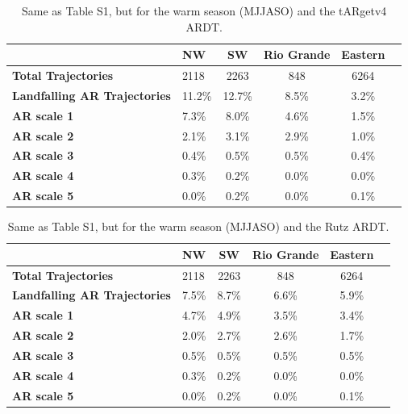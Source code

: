 \documentclass[draft,jgrga]{agutexSI2019}
\begin{document}
\begin{article}
\begin{table}
\caption{Same as Table S1, but for the warm season (MJJASO) and the tARgetv4 ARDT.}
\label{table:MJJASOtARget}
\begin{tabular}{lp{2cm}cccc}
\toprule
 & NW & SW & Rio Grande & Eastern \\
\midrule
\textbf{Total Trajectories} & 2118 & 2263 & 848 & 6264 \\
\textbf{Landfalling AR Trajectories} & 11.2\% & 12.7\% & 8.5\% & 3.2\% \\
\textbf{AR scale 1} & 7.3\% & 8.0\% & 4.6\% & 1.5\% \\
\textbf{AR scale 2} & 2.1\% & 3.1\% & 2.9\% & 1.0\% \\
\textbf{AR scale 3} & 0.4\% & 0.5\% & 0.5\% & 0.4\% \\
\textbf{AR scale 4} & 0.3\% & 0.2\% & 0.0\% & 0.0\% \\
\textbf{AR scale 5} & 0.0\% & 0.2\% & 0.0\% & 0.1\% \\
\bottomrule
\end{tabular}
\end{table}

\begin{table}
\caption{Same as Table S1, but for the warm season (MJJASO) and the Rutz ARDT.}
\label{table:MJJASOar}
\begin{tabular}{lp{2cm}cccc}
\toprule
 & NW & SW & Rio Grande & Eastern \\
\midrule
\textbf{Total Trajectories} & 2118 & 2263 & 848 & 6264 \\
\textbf{Landfalling AR Trajectories} & 7.5\% & 8.7\% & 6.6\% & 5.9\% \\
\textbf{AR scale 1} & 4.7\% & 4.9\% & 3.5\% & 3.4\% \\
\textbf{AR scale 2} & 2.0\% & 2.7\% & 2.6\% & 1.7\% \\
\textbf{AR scale 3} & 0.5\% & 0.5\% & 0.5\% & 0.5\% \\
\textbf{AR scale 4} & 0.3\% & 0.2\% & 0.0\% & 0.0\% \\
\textbf{AR scale 5} & 0.0\% & 0.2\% & 0.0\% & 0.1\% \\
\bottomrule
\end{tabular}
\end{table}


\end{article}
\end{document}
